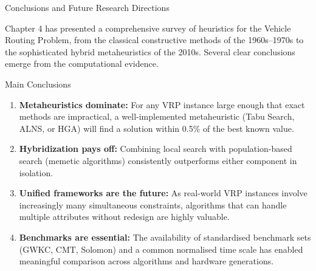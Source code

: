 \documentclass[aspectratio=169,10pt]{beamer}
\begin{document}
\begin{frame}[allowframebreaks]{Conclusions and Future Research Directions}

  Chapter 4 has presented a comprehensive survey of heuristics for
  the Vehicle Routing Problem, from the classical constructive methods
  of the 1960s--1970s to the sophisticated hybrid metaheuristics of
  the 2010s.  Several clear conclusions emerge from the computational
  evidence.

  \begin{block}{Main Conclusions}
    \begin{enumerate}
      \item \textbf{Metaheuristics dominate:} For any VRP instance large
            enough that exact methods are impractical, a well-implemented
            metaheuristic (Tabu Search, ALNS, or HGA) will find a solution
            within 0.5\% of the best known value.
      \item \textbf{Hybridization pays off:} Combining local search with
            population-based search (memetic algorithms) consistently
            outperforms either component in isolation.
      \item \textbf{Unified frameworks are the future:} As real-world
            VRP instances involve increasingly many simultaneous
            constraints, algorithms that can handle multiple attributes
            without redesign are highly valuable.
      \item \textbf{Benchmarks are essential:} The availability of
            standardised benchmark sets (GWKC, CMT, Solomon) and
            a common normalised time scale has enabled meaningful
            comparison across algorithms and hardware generations.
    \end{enumerate}
  \end{block}

  \framebreak


\end{frame}
\end{document}
